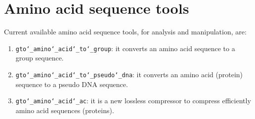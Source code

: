 \chapter{Amino acid sequence tools}
\label{seq}

Current available amino acid sequence tools, for analysis and manipulation, are:
\begin{enumerate}
	
\item \texttt{gto\char`_amino\char`_acid\char`_to\char`_group}: it converts an amino acid sequence to a group sequence.

\item \texttt{gto\char`_amino\char`_acid\char`_to\char`_pseudo\char`_dna}: it converts an amino acid (protein) sequence to a pseudo DNA sequence.

\item \texttt{gto\char`_amino\char`_acid\char`_ac}: it is a new lossless compressor to compress efficiently amino acid sequences (proteins).

\end{enumerate}




